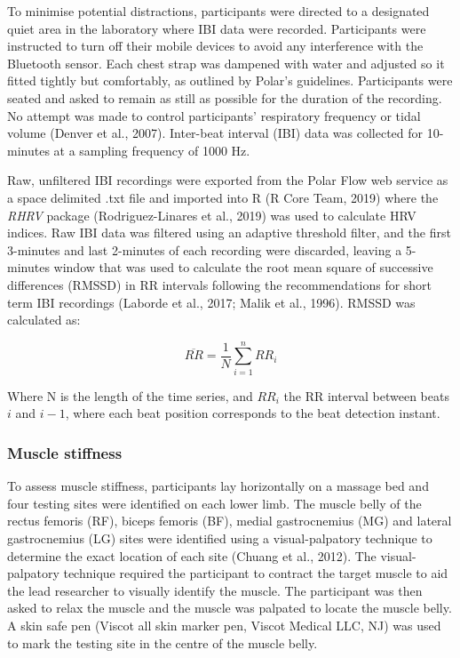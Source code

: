 \documentclass[
  english,
  man,floatsintext]{apa6}
\begin{document}
To minimise potential distractions, participants were directed to a designated quiet area in the laboratory where IBI data were recorded.
Participants were instructed to turn off their mobile devices to avoid any interference with the Bluetooth sensor.
Each chest strap was dampened with water and adjusted so it fitted tightly but comfortably, as outlined by Polar's guidelines.
Participants were seated and asked to remain as still as possible for the duration of the recording.
No attempt was made to control participants' respiratory frequency or tidal volume (Denver et al., 2007).
Inter-beat interval (IBI) data was collected for 10-minutes at a sampling frequency of 1000 Hz.

Raw, unfiltered IBI recordings were exported from the Polar Flow web service as a space delimited .txt file and imported into R (R Core Team, 2019) where the \emph{RHRV} package (Rodriguez-Linares et al., 2019) was used to calculate HRV indices.
Raw IBI data was filtered using an adaptive threshold filter, and the first 3-minutes and last 2-minutes of each recording were discarded, leaving a 5-minutes window that was used to calculate the root mean square of successive differences (RMSSD) in RR intervals following the recommendations for short term IBI recordings (Laborde et al., 2017; Malik et al., 1996). RMSSD was calculated as:

\begin{equation} 
  \overline{RR} = \frac{1}{N} \sum_{i=1}^{n} RR_i
\end{equation}

Where N is the length of the time series, and \(RR_i\) the RR interval between beats \(i\) and \(i-1\), where each beat position corresponds to the beat detection instant.

\hypertarget{muscle-stiffness}{%
\subsubsection{Muscle stiffness}\label{muscle-stiffness}}

To assess muscle stiffness, participants lay horizontally on a massage bed and four testing sites were identified on each lower limb.
The muscle belly of the rectus femoris (RF), biceps femoris (BF), medial gastrocnemius (MG) and lateral gastrocnemius (LG) sites were identified using a visual-palpatory technique to determine the exact location of each site (Chuang et al., 2012).
The visual-palpatory technique required the participant to contract the target muscle to aid the lead researcher to visually identify the muscle.
The participant was then asked to relax the muscle and the muscle was palpated to locate the muscle belly. A skin safe pen (Viscot all skin marker pen, Viscot Medical LLC, NJ) was used to mark the testing site in the centre of the muscle belly.
\end{document}
